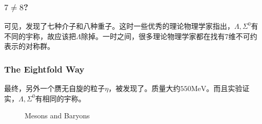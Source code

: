 \documentclass[CJK]{beamer}
\begin{document}
\begin{frame}\frametitle{\bch $7\ne 8$?\ech}
  \bch
  可见，发现了七种介子和八种重子。这时一些优秀的理论物理学家指出，$\Lambda,\Sigma^0$有不同的宇称，故应该把$\Lambda$除掉。一时之间，很多理论物理学家都在找有7维不可约表示的对称群。
  \ech
\end{frame}
\begin{frame}\frametitle{\bch The Eightfold Way\ech}
  \bch
  最终，另外一个赝无自旋的粒子$\eta$，被发现了。质量大约$550\mathrm{MeV}$。而且实验证实，$\Lambda,\Sigma^0$有相同的宇称。
  \begin{figure}
\centering  
{}
\caption{Mesons and Baryons}
\end{figure}
  \ech
\end{frame}
\end{document}
